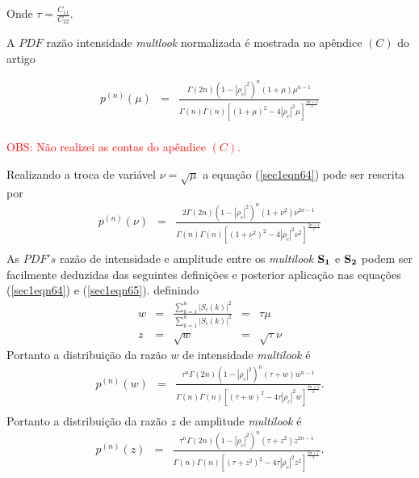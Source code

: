 \documentclass[12pt,a4paper]{article}
\begin{document}
Onde $\tau=\frac{C_{11}}{C_{22}}$.

A $PDF$ razão intensidade {\it multlook} normalizada é mostrada no apêndice $(C)$ do artigo \cite{lee94}  


\begin{equation}\label{sec1eqn64}
\begin{array}{ccc}
	p^{(n)}(\mu)&=&\frac{\Gamma(2n)(1-|\rho_c|^2)^{n}(1+\mu)\mu^{n-1}}{\Gamma(n)\Gamma(n)\left[(1+\mu)^2-4|\rho_c|^2\mu \right]^{\frac{2n+1}{2}}}\\
\end{array}
\end{equation}

\textcolor{red}{OBS: Não realizei as contas do apêndice $(C)$.}

Realizando a troca de variável $\nu=\sqrt{\mu}$ a equação (\ref{sec1eqn64}) pode ser rescrita por
\begin{equation}\label{sec1eqn65}
\begin{array}{ccc}
	p^{(n)}(\nu)&=&\frac{2\Gamma(2n)(1-|\rho_c|^2)^{n}(1+\nu^2)\nu^{2n-1}}{\Gamma(n)\Gamma(n)\left[(1+\nu^2)^2-4|\rho_c|^2\nu^2 \right]^{\frac{2n+1}{2}}}\\
\end{array}
\end{equation}
As $PDF's$ razão de intensidade e amplitude entre os {\it multilook} ${\bf S_1}$ e ${\bf S_2}$ podem ser facilmente deduzidas das seguintes definições e posterior aplicação nas equações (\ref{sec1eqn64}) e (\ref{sec1eqn65}). definindo 
\begin{equation}\label{sec1eqn66}
\begin{array}{ccccc}
	w&=&\frac{\displaystyle{\sum_{k=1}^{n}|S_i(k)|^2}}{\displaystyle{\sum_{k=1}^{n}|S_i(k)|^2}}&=&\tau\mu\\
	z&=&\sqrt{w}&=&\sqrt{\tau}\nu
\end{array}
\end{equation}
Portanto a distribuição da razão $w$ de intensidade {\it multilook} é
\begin{equation}\label{sec1eqn67}
\begin{array}{ccc}
	p^{(n)}(w)&=&\frac{\tau^{n}\Gamma(2n)(1-|\rho_c|^2)^{n}(\tau+w)w^{n-1}}{\Gamma(n)\Gamma(n)\left[(\tau+w)^2-4\tau|\rho_c|^2w \right]^{\frac{2n+1}{2}}}.\\
\end{array}
\end{equation}
Portanto a distribuição da razão $z$ de amplitude {\it multilook} é
\begin{equation}\label{sec1eqn68}
\begin{array}{ccc}
	p^{(n)}(z)&=&\frac{\tau^{n}\Gamma(2n)(1-|\rho_c|^2)^{n}(\tau+z^2)z^{2n-1}}{\Gamma(n)\Gamma(n)\left[(\tau+z^2)^2-4\tau|\rho_c|^2z^2 \right]^{\frac{2n+1}{2}}}.\\
\end{array}
\end{equation}
\end{document}
